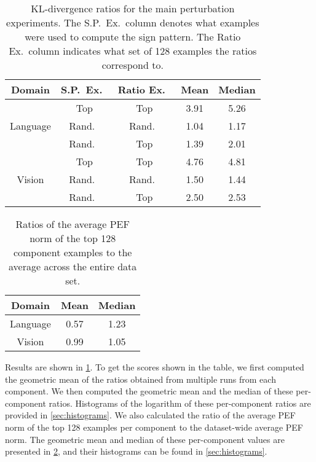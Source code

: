 \documentclass[dvipsnames]{article}
\begin{document}
\begin{table}[t]
\caption{%
KL-divergence ratios for the main perturbation experiments. The S.P.\ Ex.\ column denotes what examples were used to compute the sign pattern. The Ratio Ex.\ column indicates what set of 128 examples the ratios correspond to.}
\label{table:h_kl_ratios}
\vskip 0.15in
\begin{center}
\begin{small}
\begin{sc}
\begin{tabular}{ccccc}
\toprule
Domain & S.P.\ Ex.\ & Ratio Ex.\ & Mean & Median \\
\midrule
  & Top & Top & 3.91 & 5.26 \\
Language & Rand.\ & Rand.\ & 1.04 & 1.17 \\
 & Rand.\ & Top & 1.39 & 2.01 \\
\midrule
  & Top & Top & 4.76 & 4.81 \\
Vision & Rand.\ & Rand.\ & 1.50 & 1.44 \\
 & Rand.\ & Top & 2.50 & 2.53 \\
\bottomrule
\end{tabular}
\end{sc}
\end{small}
\end{center}
\vskip -0.1in
\end{table}

\begin{table}[t]
\caption{Ratios of the average PEF norm of the top 128 component examples to the average across the entire data set.}
\label{table:pef_ratios}
\vskip 0.15in
\begin{center}
\begin{small}
\begin{sc}
\begin{tabular}{ccc}
\toprule
Domain & Mean & Median \\
\midrule
Language & 0.57 & 1.23 \\
Vision & 0.99 & 1.05 \\
\bottomrule
\end{tabular}
\end{sc}
\end{small}
\end{center}
\vskip -0.1in
\end{table}

Results are shown in \cref{table:h_kl_ratios}.
To get the scores shown in the table, we first computed the geometric mean of the ratios obtained from multiple runs from each component.
We then computed the geometric mean and the median of these per-component ratios.
Histograms of the logarithm of these per-component ratios are provided in \cref{sec:histograms}.
We also calculated the ratio of the average PEF norm of the top 128 examples per component to the dataset-wide average PEF norm.
The geometric mean and median of these per-component values are presented in \cref{table:pef_ratios}, and their histograms can be found in \cref{sec:histograms}.
\end{document}
